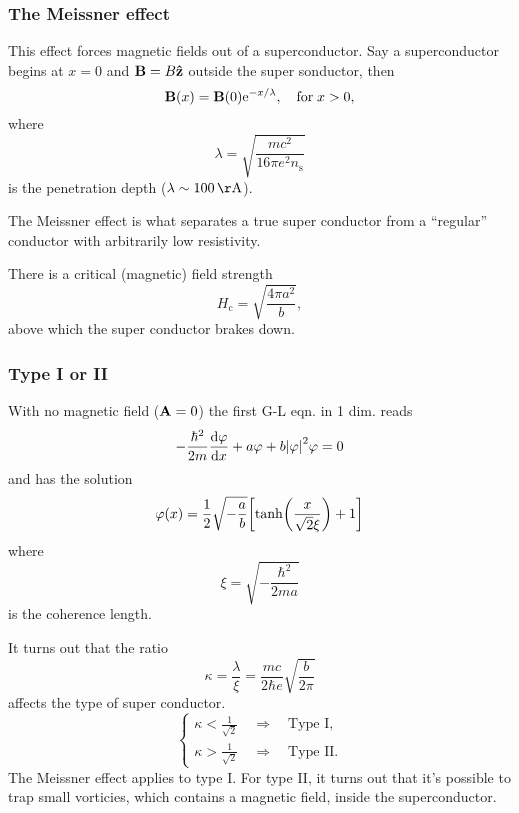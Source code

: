 \documentclass[11pt,letter, swedish, english, twocolumn
]{article}
\newcommand{\ns}{\ensuremath{{n_{\text{s}}}}}
\newcommand{\Hc}{\ensuremath{{H_{\text{c}}}}}
\begin{document}
\subsubsection{The Meissner effect}
This effect forces magnetic fields out of a superconductor.
Say a superconductor begins at $x=0$ and $\vb{B}=B\vu{z}$ outside the
super sonductor, then
\begin{equation}
\vb{B}(x)=\vb{B}(0)\ee^{-x/\lambda}\qcomma \text{for}\;x>0,
\end{equation}
where
\begin{equation}
\lambda=\sqrt{\frac{mc^2}{16\pi e^2\ns}}
\end{equation}
is the penetration depth ($\lambda\sim\unit[100]{Å}$).

The Meissner effect is what separates a true super conductor from a
``regular'' conductor with arbitrarily low resistivity. 


There is a critical (magnetic) field strength
\begin{equation}
\Hc = \sqrt{\frac{4\pi a^2}{b}},
\end{equation}
above which the super conductor brakes down. 

\subsubsection{Type I or II}
With no magnetic field ($\vb{A}=0$) the first G-L eqn. in 1 dim. reads 
\begin{equation}
-\frac{\hbar^2}{2m}\dv{\varphi}{x}+a\varphi+b\abs{\varphi}^2\varphi=0
\end{equation}
and has the solution
\begin{equation}
\varphi(x)=\frac{1}{2}\sqrt{-\frac{a}{b}}
\qty[\tanh(\frac{x}{\sqrt{2}\xi})+1]
\end{equation}
where
\begin{equation}
\xi=\sqrt{-\frac{\hbar^2}{2ma}}
\end{equation}
is the coherence length.

It turns out that the ratio
\begin{equation}
\kappa=\frac{\lambda}{\xi}=\frac{mc}{2\hbar e}\sqrt{\frac{b}{2\pi}}
\end{equation}
affects the type of
super conductor.
\begin{equation}
\begin{cases}
\kappa<\frac{1}{\sqrt{2}} \quad\Longrightarrow\quad \text{Type I},\\
\kappa>\frac{1}{\sqrt{2}} \quad\Longrightarrow\quad \text{Type II}.
\end{cases}
\end{equation}
The  Meissner effect applies to type I. For type II, it turns out that
it's possible to trap small vorticies, which contains a magnetic
field, inside the superconductor. 
\end{document}
